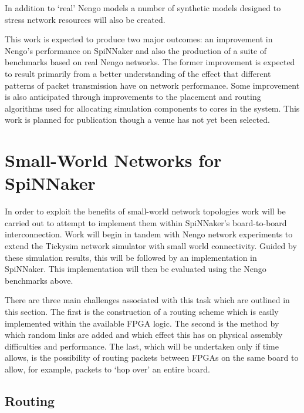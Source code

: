 		In addition to `real' Nengo models a number of synthetic models designed to
		stress network resources will also be created.
		
		This work is expected to produce two major outcomes: an improvement in
		Nengo's performance on SpiNNaker and also the production of a suite of
		benchmarks based on real Nengo networks. The former improvement is expected
		to result primarily from a better understanding of the effect that different
		patterns of packet transmission have on network performance. Some
		improvement is also anticipated through improvements to the placement and
		routing algorithms used for allocating simulation components to cores in the
		system. This work is planned for publication though a venue has not yet been
		selected.
		
	
	\section{Small-World Networks for SpiNNaker}
		
		
		In order to exploit the benefits of small-world network topologies work will
		be carried out to attempt to implement them within SpiNNaker's
		board-to-board interconnection. Work will begin in tandem with Nengo network
		experiments to extend the Tickysim network simulator with small world
		connectivity. Guided by these simulation results, this will be followed by
		an implementation in SpiNNaker. This implementation will then be evaluated
		using the Nengo benchmarks above.
		
		There are three main challenges associated with this task which are outlined
		in this section. The first is the construction of a routing scheme which is
		easily implemented within the available FPGA logic. The second is the method
		by which random links are added and which effect this has on physical
		assembly difficulties and performance. The last, which will be undertaken
		only if time allows, is the possibility of routing packets between FPGAs on
		the same board to allow, for example, packets to `hop over' an entire board.
		
		\subsection{Routing}
			
